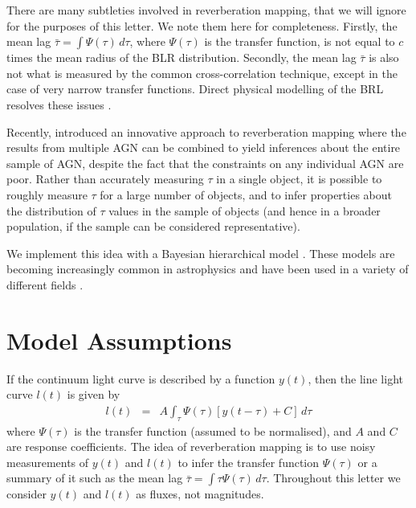 \documentclass[useAMS,usenatbib]{mn2e}
\begin{document}
There are many subtleties involved in reverberation mapping, that we will ignore
for the purposes of this letter. We note them here for completeness. Firstly,
the mean lag $\bar{\tau} = \int \Psi(\tau)\, d\tau$, where $\Psi(\tau)$
is the transfer function, is not equal to $c$ times the mean radius of the BLR
distribution. Secondly, the mean lag $\bar{\tau}$ is also not what is measured
by the common
cross-correlation technique, except in the case of very narrow
transfer functions. Direct physical modelling of the BRL resolves these
issues \citep{pancoast, arp151}.

Recently, \citet{2012MNRAS.427.2701F, 2013MNRAS.434L..16F} introduced an
innovative approach to reverberation mapping where the results from multiple
AGN can be combined to yield inferences about the entire sample of AGN,
despite the fact that the constraints on any individual AGN are poor. Rather
than accurately measuring $\tau$ in a single object, it is possible to roughly
measure $\tau$ for a large number of objects, and to infer properties about
the distribution of $\tau$ values in the sample of objects (and hence in
a broader population, if the sample can be considered representative).

We implement this idea with a Bayesian hierarchical model
\citep{2012arXiv1208.3036L}.
These models are becoming increasingly common in astrophysics and have been
used in a variety of different fields
\citep[e.g.][]{extreme_deconvolution, loredo, kelly, 2013AJ....146....7B}.

\section{Model Assumptions}

If the continuum light curve is described by a function $y(t)$, then the line
light curve $l(t)$ is given by
\begin{eqnarray}
l(t) &=& A \int_\tau \Psi(\tau)\left[y(t - \tau) + C\right] \, d\tau
\end{eqnarray}
where $\Psi(\tau)$ is the transfer function (assumed to be normalised),
and $A$ and $C$ are response
coefficients. The idea of reverberation mapping is to use noisy measurements
of $y(t)$ and $l(t)$ to infer the transfer function $\Psi(\tau)$ or a summary
of it such as the mean lag $\bar{\tau} = \int \tau\Psi(\tau) \, d\tau$.
Throughout this letter we consider $y(t)$ and $l(t)$ as fluxes, not magnitudes.
\end{document}
